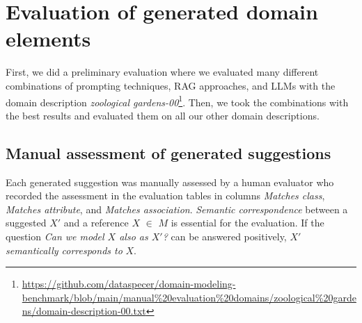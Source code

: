 %


\section{Evaluation of generated domain elements}

First, we did a preliminary evaluation where we evaluated many different combinations of prompting techniques, RAG approaches, and LLMs with the domain description \textit{zoological gardens-00}\footnote{\url{https://github.com/dataspecer/domain-modeling-benchmark/blob/main/manual\%20evaluation\%20domains/zoological\%20gardens/domain-description-00.txt}}. Then, we took the combinations with the best results and evaluated them on all our other domain descriptions.


\subsection{Manual assessment of generated suggestions}

Each generated suggestion was manually assessed by a human evaluator who recorded the assessment in the evaluation tables in columns \emph{Matches class}, \emph{Matches attribute}, and \emph{Matches association}.
\emph{Semantic correspondence} between a suggested $X'$ and a reference $X$ $\in$ $M$ is essential for the evaluation.
If the question \emph{Can we model $X$ also as $X'$?} can be answered positively, $X'$ \emph{semantically corresponds to} $X$.

